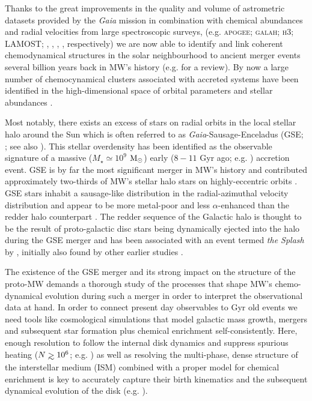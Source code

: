 \documentclass[useAMS,usenatbib]{mnras}
\def\gtrsim{\mathrel{\hbox{\rlap{\hbox{\lower4pt\hbox{$\sim$}}}\hbox{$>$}}}}
\begin{document}
Thanks to the great improvements in the quality and volume of astrometric datasets provided by the {\it Gaia} mission in combination with chemical abundances and radial velocities from large spectroscopic surveys, (e.g. \textsc{apogee}; \textsc{galah}; \textsc{h3}; \textsc{LAMOST}; \citealt{Majewski2017}, \citealt{Martell2017}, \citealt{Conroy2019}, \citealt{Zhao_2012}, respectively) we are now able to identify and link coherent chemodynamical structures in the solar neighbourhood to ancient merger events several billion years back in MW's history (e.g. \citealt{Helmi2020} for a review). By now a large number of chemocynamical clusters associated with accreted systems have been identified in the high-dimensional space of orbital parameters and stellar abundances \citep[e.g.,][]{Belokurov18, Helmi18, Myeong19a, Naidu20a, Horta21, Myeong2022}.

Most notably, there exists an excess of stars on radial orbits in the local stellar halo around the Sun which is often referred to as {\it Gaia}-Sausage-Enceladus (GSE; \citealt{Belokurov2018, Helmi2018}; see also \citealt{Nissen2010, Koppelman2018, Haywood2018}). This stellar overdensity has been identified as the observable signature of a massive ($M_{\star} \simeq 10^{9}$ $\rm{M_{\odot}}$) early ($8-11$ Gyr ago; e.g. \citealt{Vin2019, Bel_2020, Naidu21, Xiang22}) accretion event. GSE is by far the most significant merger in MW's history and contributed approximately two-thirds of MW's stellar halo stars on highly-eccentric orbits \citep[e.g.][]{Mackereth+Bovy20}. GSE stars inhabit a sausage-like distribution in the radial-azimuthal velocity distribution \citep{Brook2003, Belokurov2018} and appear to be more metal-poor and less $\alpha$-enhanced than the redder halo counterpart \citep{Haywood_2018a, Helmi_2018}. The redder sequence of the Galactic halo is thought to be the result of proto-galactic disc stars being dynamically ejected into the halo during the GSE merger and has been associated with an event termed {\it the Splash} by \cite{Belokurov2020, Bonaca2020}, initially also found by other earlier studies \citep{Bonaca2017, Haywood2018, DiMatteo2019, Gallart2019}. 

The existence of the GSE merger and its strong impact on the structure of the proto-MW demands a thorough study of the processes that shape MW's chemo-dynamical evolution during such a merger in order to interpret the observational data at hand. In order to connect present day observables to Gyr old events we need tools like cosmological simulations that model galactic mass growth, mergers and subsequent star formation plus chemical enrichment self-consistently. Here, enough resolution to follow the internal disk dynamics and suppress spurious heating ($N \gtrsim 10^6$; e.g. \citealt{Sellwood2013,Ludlow2019DiskHeating, Ludlow2021}) as well as resolving the multi-phase, dense structure of the interstellar medium (ISM) combined with a proper model for chemical enrichment \citep[e.g.][]{Buck2021} is key to accurately capture their birth kinematics and the subsequent dynamical evolution of the disk (e.g. \citealt{House2011, Bird2013}).
\end{document}
